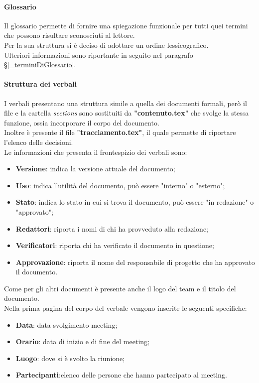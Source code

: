 \paragraph{Glossario}
Il glossario permette di fornire una spiegazione funzionale per tutti quei termini che possono risultare sconosciuti al lettore.\\
Per la sua struttura si è deciso di adottare un ordine lessicografico.\\
Ulteriori informazioni sono riportante in seguito nel paragrafo \S\ref{_terminiDiGlossario}.

\paragraph{Struttura dei verbali}
I verbali presentano una struttura simile a quella dei documenti formali, però il file e la cartella \textit{sections} sono sostituiti da \textbf{"contenuto.tex"} che svolge la stessa funzione, ossia incorporare il corpo del documento.\\
Inoltre è presente il file \textbf{"tracciamento.tex"}, il quale permette di riportare l'elenco delle decisioni.\\
Le informazioni che presenta il frontespizio dei verbali sono:
\begin{itemize}
    \item\textbf{Versione}: indica la versione attuale del documento;
    \item\textbf{Uso}: indica l'utilità del documento, può essere "interno" o "esterno";
    \item\textbf{Stato}: indica lo stato in cui si trova il documento, può essere "in redazione" o "approvato";
    \item\textbf{Redattori}: riporta i nomi di chi ha provveduto alla redazione;
    \item\textbf{Verificatori}: riporta chi ha verificato il documento in questione;
    \item\textbf{Approvazione}: riporta il nome del responsabile di progetto che ha approvato il documento.
\end{itemize}
Come per gli altri documenti è presente anche il logo del team e il titolo del documento.\\
Nella prima pagina del corpo del verbale vengono inserite le seguenti specifiche:
\begin{itemize}
    \item\textbf{Data}: data svolgimento meeting;
    \item\textbf{Orario}: data di inizio e di fine del meeting;
    \item\textbf{Luogo}: dove si è svolto la riunione;
    \item\textbf{Partecipanti}:elenco delle persone che hanno partecipato al meeting.
\end{itemize}
